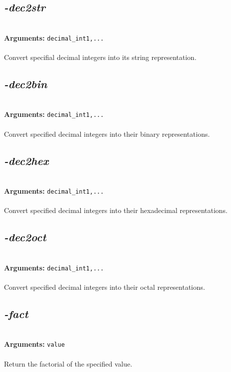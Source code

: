 \documentclass[a4paper,11pt,twoside]{book}
\begin{document}
\subsection{\emph{-dec2str} }\vspace*{-0.5em}
~\\\textbf{Arguments: } 
{\small \texttt{decimal\_int1,...}}\\~\\
Convert specifial decimal integers into its string representation.


\subsection{\emph{-dec2bin} }\vspace*{-0.5em}
~\\\textbf{Arguments: } 
{\small \texttt{decimal\_int1,...}}\\~\\
Convert specified decimal integers into their binary representations.


\subsection{\emph{-dec2hex} }\vspace*{-0.5em}
~\\\textbf{Arguments: } 
{\small \texttt{decimal\_int1,...}}\\~\\
Convert specified decimal integers into their hexadecimal representations.


\subsection{\emph{-dec2oct} }\vspace*{-0.5em}
~\\\textbf{Arguments: } 
{\small \texttt{decimal\_int1,...}}\\~\\
Convert specified decimal integers into their octal representations.


\subsection{\emph{-fact} }\vspace*{-0.5em}
~\\\textbf{Arguments: } 
{\small \texttt{value}}\\~\\
Return the factorial of the specified value.
\end{document}
